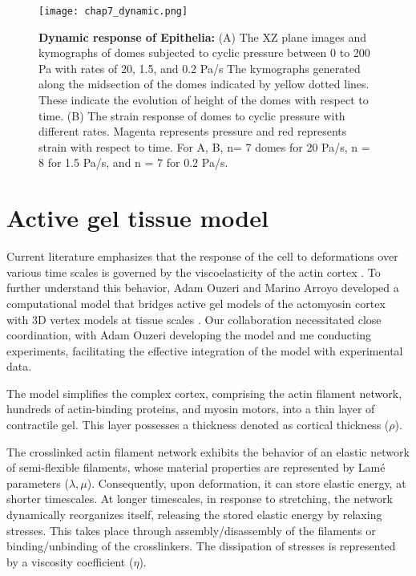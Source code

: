 \begin{figure}[]
	\centering
	\texttt{[image: chap7\_dynamic.png]}
	\caption{\label{fig_7_6} \textbf{Dynamic response of Epithelia:} (A) The XZ plane images and kymographs of domes subjected to cyclic pressure between 0 to 200 Pa with rates of 20, 1.5, and 0.2 Pa/s The kymographs generated along the midsection of the domes indicated by yellow dotted lines. These indicate the evolution of height of the domes with respect to time. (B) The strain response of domes to cyclic pressure with different rates. Magenta represents pressure and red represents strain with respect to time. For A, B, n= 7 domes for 20 Pa/s, n = 8 for 1.5 Pa/s, and n = 7 for 0.2 Pa/s. 
	}
\end{figure}

\newpage

\hypertarget{active-gel-tissue-model}{%
	\section{Active gel tissue model}\label{active-gel-tissue-model}}

Current literature emphasizes that the response of the cell to deformations over various time scales is governed by the viscoelasticity of the actin cortex \cite{kelkar2020, clement2017, khalilgharibi2019}. To further understand this behavior, Adam Ouzeri and Marino Arroyo developed a computational model that bridges active gel models of the actomyosin cortex with 3D vertex models at tissue scales \cite{ouzeri2023}. Our collaboration necessitated close coordination, with Adam Ouzeri developing the model and me conducting experiments, facilitating the effective integration of the model with experimental data.

The model simplifies the complex cortex, comprising the actin filament network, hundreds of actin-binding proteins, and myosin motors, into a thin layer of contractile gel. This layer possesses a thickness denoted as cortical thickness (\(\rho\)).

The crosslinked actin filament network exhibits the behavior of an elastic network of semi-flexible filaments, whose material properties are represented by Lamé parameters  (\(\lambda,\mu\)). Consequently, upon deformation, it can store elastic energy, at shorter timescales. At longer timescales, in response to stretching, the network dynamically reorganizes itself, releasing the stored elastic energy by relaxing stresses. This takes place through assembly/disassembly of the filaments or binding/unbinding of the crosslinkers. The dissipation of stresses is represented by a viscosity coefficient (\(\eta\)).

